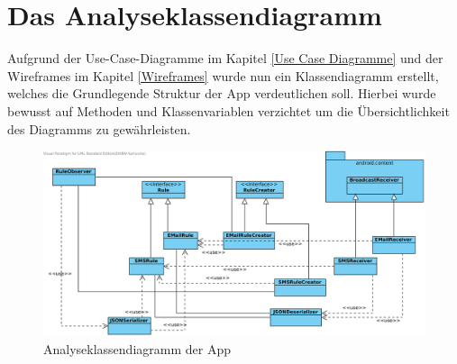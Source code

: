 \section{Das Analyseklassendiagramm}
Aufgrund der Use-Case-Diagramme im Kapitel \ref{Use Case Diagramme} und der Wireframes im Kapitel \ref{Wireframes} wurde nun ein Klassendiagramm erstellt, welches die Grundlegende Struktur der App verdeutlichen soll. Hierbei wurde bewusst auf Methoden und Klassenvariablen verzichtet um die \"Ubersichtlichkeit des Diagramms zu gew\"ahrleisten.


\begin{figure}[!ht]
\centering
\includegraphics[width=16cm]{Bilder/AKD.png}
\caption{Analyseklassendiagramm der App}
\label{AKD}
\centering
\end{figure}